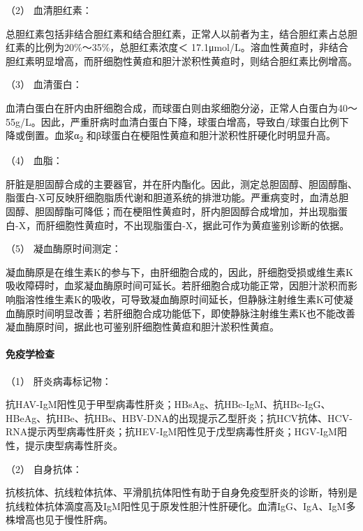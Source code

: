 \hypertarget{text00039.htmlux5cux23CHP1-16-3-4-3-2}{}
（2） 血清胆红素：

总胆红素包括非结合胆红素和结合胆红素，正常人以前者为主，结合胆红素占总胆红素的比例为20\%～35\%，总胆红素浓度＜
17.1μmol/L。溶血性黄疸时，非结合胆红素明显增高，而肝细胞性黄疸和胆汁淤积性黄疸时，则结合胆红素比例增高。

\hypertarget{text00039.htmlux5cux23CHP1-16-3-4-3-3}{}
（3） 血清蛋白：

血清白蛋白在肝内由肝细胞合成，而球蛋白则由浆细胞分泌，正常人白蛋白为40～55g/L。因此，严重肝病时血清白蛋白下降，球蛋白增高，导致白/球蛋白比例下降或倒置。血浆α\textsubscript{2}
和β球蛋白在梗阻性黄疸和胆汁淤积性肝硬化时明显升高。

\hypertarget{text00039.htmlux5cux23CHP1-16-3-4-3-4}{}
（4） 血脂：

肝脏是胆固醇合成的主要器官，并在肝内酯化。因此，测定总胆固醇、胆固醇酯、脂蛋白-X可反映肝细胞脂质代谢和胆道系统的排泄功能。严重病变时，血清总胆固醇、胆固醇酯可降低；而在梗阻性黄疸时，肝内胆固醇合成增加，并出现脂蛋白-X，而肝细胞性黄疸时，不出现脂蛋白-X，据此可作为黄疸鉴别诊断的依据。

\hypertarget{text00039.htmlux5cux23CHP1-16-3-4-3-5}{}
（5） 凝血酶原时间测定：

凝血酶原是在维生素K的参与下，由肝细胞合成的，因此，肝细胞受损或维生素K吸收障碍时，血浆凝血酶原时间可延长。若肝细胞合成功能正常，因胆汁淤积而影响脂溶性维生素K的吸收，可导致凝血酶原时间延长，但静脉注射维生素K可使凝血酶原时间明显改善；若肝细胞合成功能低下，即使静脉注射维生素K也不能改善凝血酶原时间，据此也可鉴别肝细胞性黄疸和胆汁淤积性黄疸。

\paragraph{免疫学检查}

\hypertarget{text00039.htmlux5cux23CHP1-16-3-4-4-1}{}
（1） 肝炎病毒标记物：

抗HAV-IgM阳性见于甲型病毒性肝炎；HBsAg、抗HBc-IgM、抗HBc-IgG、HBeAg、抗HBe、抗HBs、HBV-DNA的出现提示乙型肝炎；抗HCV抗体、HCV-RNA提示丙型病毒性肝炎；抗HEV-IgM阳性见于戊型病毒性肝炎；HGV-IgM阳性，提示庚型病毒性肝炎。

\hypertarget{text00039.htmlux5cux23CHP1-16-3-4-4-2}{}
（2） 自身抗体：

抗核抗体、抗线粒体抗体、平滑肌抗体阳性有助于自身免疫型肝炎的诊断，特别是抗线粒体抗体滴度高及IgM阳性见于原发性胆汁性肝硬化。血清IgG、IgA、IgM多株增高也见于慢性肝病。

